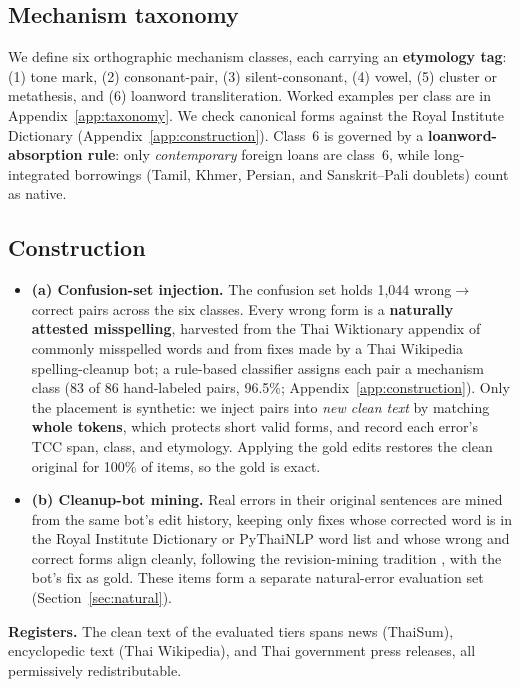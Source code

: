 \documentclass[11pt]{article}
\begin{document}
\subsection{Mechanism taxonomy}
We define six orthographic mechanism classes, each carrying an \textbf{etymology tag}: (1) tone
mark, (2) consonant-pair, (3) silent-consonant, (4) vowel, (5) cluster or metathesis, and
(6) loanword transliteration. Worked examples per class are in Appendix~\ref{app:taxonomy}. We
check canonical forms against the Royal Institute Dictionary \citep{royalinstitute-2013-dictionary}
(Appendix~\ref{app:construction}). Class~6 is governed by a
\textbf{loanword-absorption rule}: only \emph{contemporary} foreign loans are class~6, while
long-integrated borrowings (Tamil, Khmer, Persian, and Sanskrit--Pali doublets) count as native.

\subsection{Construction}
\begin{itemize}\itemsep2pt
\item \textbf{(a) Confusion-set injection.} The confusion set holds 1{,}044 wrong$\to$correct
pairs across the six classes. Every wrong form is a \textbf{naturally attested misspelling},
harvested from the Thai Wiktionary appendix of commonly misspelled words and from fixes made by
a Thai Wikipedia spelling-cleanup bot; a rule-based classifier assigns each pair a mechanism
class (83 of 86 hand-labeled pairs, 96.5\%; Appendix~\ref{app:construction}). Only the
placement is synthetic: we inject pairs into \emph{new clean text} by matching
\textbf{whole tokens}, which protects short valid forms, and record each error's TCC span,
class, and etymology. Applying
the gold edits restores the clean original for 100\% of items, so the gold is exact.
\item \textbf{(b) Cleanup-bot mining.} Real errors in their original sentences are mined from
the same bot's edit history, keeping only fixes whose corrected word is in the Royal Institute
Dictionary or PyThaiNLP word list and whose wrong and correct forms align cleanly, following the
revision-mining tradition
\citep{tanaka-etal-2020-building,grundkiewicz-junczysdowmunt-2014-wiked}, with the bot's fix as
gold. These items form a separate natural-error evaluation set (Section~\ref{sec:natural}).
\end{itemize}
\noindent\textbf{Registers.} The clean text of the evaluated tiers spans news (ThaiSum),
encyclopedic text (Thai Wikipedia), and Thai government press releases, all permissively
redistributable.
\end{document}
